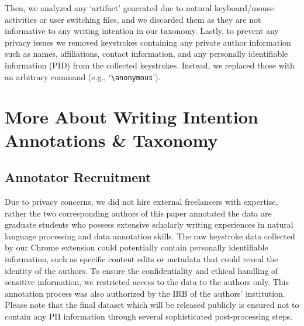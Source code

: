 Then, we analyzed any `artifact' generated due to natural keyboard/mouse activities or user switching files, and we discarded them as they are not informative to any writing intention in our taxonomy. 
Lastly, to prevent any privacy issues we removed keystrokes containing any private author information such as names, affiliations,  contact information, and any personally identifiable information (PID) from the collected keystrokes. Instead,  we replaced those with an arbitrary command (e.g., `\texttt{\textbackslash anonymous}').




\section{More About Writing Intention Annotations \& Taxonomy} \label{sec:appendix:annotation}

\subsection{Annotator Recruitment}

Due to privacy concerns, we did not hire external freelancers with expertise, rather the two corresponding authors of this paper annotated the data are graduate students who possess extensive scholarly writing experiences in natural language processing and data annotation skills. The raw keystroke data collected by our Chrome extension could potentially contain personally identifiable information, such as specific content edits or metadata that could reveal the identity of the authors. To ensure the confidentiality and ethical handling of sensitive information, we restricted access to the data to the authors only. This annotation process was also authorized by the IRB of the authors’ institution. Please note that the final dataset which will be released publicly is ensured not to contain any PII information through several sophisticated post-processing steps. 



